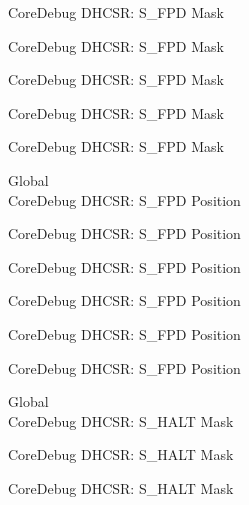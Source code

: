 \begin{DoxyRefList}
\label{deprecated__deprecated000465}%
%
Core\+Debug DHCSR\+: S\+\_\+\+FPD Mask 

\label{deprecated__deprecated000567}%
%
Core\+Debug DHCSR\+: S\+\_\+\+FPD Mask 

\label{deprecated__deprecated000692}%
%
Core\+Debug DHCSR\+: S\+\_\+\+FPD Mask 

\label{deprecated__deprecated001143}%
%
Core\+Debug DHCSR\+: S\+\_\+\+FPD Mask 

\label{deprecated__deprecated001245}%
%
Core\+Debug DHCSR\+: S\+\_\+\+FPD Mask  
\item[Global \doxylink{group___c_m_s_i_s___s_c_b_ga620b141720c475f5bde4138855c6ed83}{Core\+Debug\+\_\+\+DHCSR\+\_\+\+S\+\_\+\+FPD\+\_\+\+Pos} ]\hfill \\
\label{deprecated__deprecated000013}%
%
Core\+Debug DHCSR\+: S\+\_\+\+FPD Position 

\label{deprecated__deprecated000464}%
%
Core\+Debug DHCSR\+: S\+\_\+\+FPD Position 

\label{deprecated__deprecated000566}%
%
Core\+Debug DHCSR\+: S\+\_\+\+FPD Position 

\label{deprecated__deprecated000691}%
%
Core\+Debug DHCSR\+: S\+\_\+\+FPD Position 

\label{deprecated__deprecated001142}%
%
Core\+Debug DHCSR\+: S\+\_\+\+FPD Position 

\label{deprecated__deprecated001244}%
%
Core\+Debug DHCSR\+: S\+\_\+\+FPD Position  
\item[Global \doxylink{group___c_m_s_i_s___core_debug_ga9f881ade3151a73bc5b02b73fe6473ca}{Core\+Debug\+\_\+\+DHCSR\+\_\+\+S\+\_\+\+HALT\+\_\+\+Msk} ]\hfill \\
\label{deprecated__deprecated000026}%
%
Core\+Debug DHCSR\+: S\+\_\+\+HALT Mask 

\label{deprecated__deprecated000118}%
%
Core\+Debug DHCSR\+: S\+\_\+\+HALT Mask 

\label{deprecated__deprecated000172}%
%
Core\+Debug DHCSR\+: S\+\_\+\+HALT Mask 


\end{DoxyRefList}
